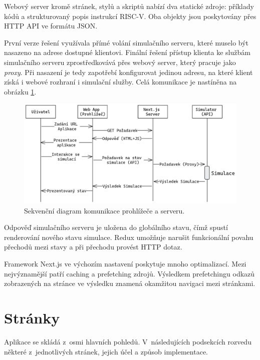 Webový server kromě stránek, stylů a skriptů nabízí dva statické zdroje: příklady kódů a strukturovaný popis instrukcí RISC-V.
Oba objekty jsou poskytovány přes HTTP API ve formátu JSON.

První verze řešení využívala přímé volání simulačního serveru, které muselo být nasazeno na adrese dostupné klientovi.
Finální řešení přístup klienta ke službám simulačního serveru zprostředkovává přes webový server, který pracuje jako \emph{proxy}.
Při nasazení je tedy zapotřebí konfigurovat jedinou adresu, na které klient získá i webové rozhraní i simulační služby.
Celá komunikace je nastíněna na obrázku \ref{diagramApiComms}.

\begin{figure}[ht]
    \includegraphics[width=\textwidth]{obrazky-figures/impl/apicomms.png}
    \caption{Sekvenční diagram komunikace prohlížeče a serveru.}
    \label{diagramApiComms}
\end{figure}

Odpověď simulačního serveru je uložena do globálního stavu, čímž spustí renderování nového stavu simulace.
Redux umožňuje narušit funkcionální povahu přechodů mezi stavy a při přechodu provést HTTP dotaz. 

Framework Next.js ve výchozím nastavení poskytuje mnoho optimalizací.
Mezi nejvýznamější patří caching a prefetching zdrojů.
Výsledkem prefetchingu odkazů zobrazených na stránce ve výsledku znamená okamžitou navigaci mezi stránkami. 

\section{Stránky}

Aplikace se skládá z~osmi hlavních pohledů.
V~následujících podsekcích rozvedu některé z~jednotlivých stránek, jejich účel a způsob implementace.

